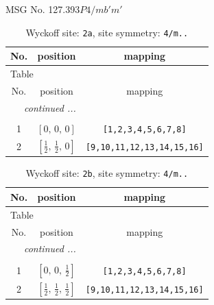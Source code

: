 \documentclass[fleqn,8pt]{jsarticle}
\begin{document}
\setcounter{MaxMatrixCols}{32}

\renewcommand{\tablename}{Table~}
\renewcommand{\figurename}{Figure~}
\begin{center}
\LARGE
MSG No. 127.393\quad$P4/mb'm'$
\end{center}
\renewcommand{\arraystretch}{1.2}
\begin{longtable}{ccc}
\caption{Wyckoff site: {\tt 2a}, site symmetry: {\tt 4/m..}}
 \\
 \hline \hline
No. & position & mapping \\ \hline \endfirsthead

\multicolumn{2}{l}{\tablename\ \thetable{}} \\
 \hline \hline
No. & position & mapping \\ \hline \endhead

 \hline \hline
\multicolumn{2}{r}{\footnotesize\it continued ...} \\ \endfoot

 \hline \hline
\multicolumn{2}{r}{} \\ \endlastfoot

1 & $\left[ 0,\, 0,\, 0 \right]$ & {\tt [1,2,3,4,5,6,7,8]} \\ \hline
2 & $\left[ \frac{1}{2},\, \frac{1}{2},\, 0 \right]$ & {\tt [9,10,11,12,13,14,15,16]} \\
\end{longtable}
\renewcommand{\arraystretch}{1.2}
\begin{longtable}{ccc}
\caption{Wyckoff site: {\tt 2b}, site symmetry: {\tt 4/m..}}
 \\
 \hline \hline
No. & position & mapping \\ \hline \endfirsthead

\multicolumn{2}{l}{\tablename\ \thetable{}} \\
 \hline \hline
No. & position & mapping \\ \hline \endhead

 \hline \hline
\multicolumn{2}{r}{\footnotesize\it continued ...} \\ \endfoot

 \hline \hline
\multicolumn{2}{r}{} \\ \endlastfoot

1 & $\left[ 0,\, 0,\, \frac{1}{2} \right]$ & {\tt [1,2,3,4,5,6,7,8]} \\ \hline
2 & $\left[ \frac{1}{2},\, \frac{1}{2},\, \frac{1}{2} \right]$ & {\tt [9,10,11,12,13,14,15,16]} \\
\end{longtable}
\end{document}
